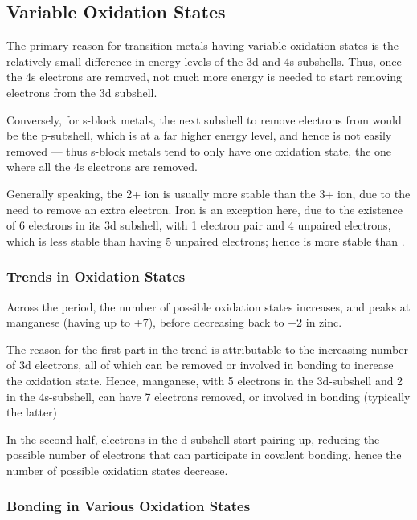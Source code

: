 		\subsection{Variable Oxidation States}

			The primary reason for transition metals having variable oxidation states is the relatively small difference in energy levels
			of the 3d and 4s subshells. Thus, once the 4s electrons are removed, not much more energy is needed to start removing electrons
			from the 3d subshell.

			Conversely, for s-block metals, the next subshell to remove electrons from would be the p-subshell, which is at a far higher
			energy level, and hence is not easily removed --- thus s-block metals tend to only have one oxidation state, the one where all the
			4s electrons are removed.

			Generally speaking, the 2+ ion is usually more stable than the 3+ ion, due to the need to remove an extra electron. Iron is an
			exception here, due to the existence of 6 electrons in its 3d subshell, with 1 electron pair and 4 unpaired electrons, which
			is less stable than having 5 unpaired electrons; hence  is more stable than .

			\subsubsection{Trends in Oxidation States}

				Across the period, the number of possible oxidation states increases, and peaks at manganese (having up to +7), before
				decreasing back to +2 in zinc.

				The reason for the first part in the trend is attributable to the increasing number of 3d electrons, all of which can be
				removed or involved in bonding to increase the oxidation state. Hence, manganese, with 5 electrons in the 3d-subshell and 2
				in the 4s-subshell, can have 7 electrons removed, or involved in bonding (typically the latter)

				In the second half, electrons in the d-subshell start pairing up, reducing the possible number of electrons that can participate
				in covalent bonding, hence the number of possible oxidation states decrease.


			\subsubsection{Bonding in Various Oxidation States}

